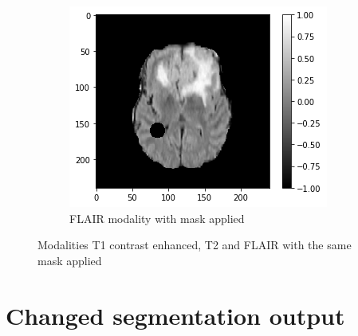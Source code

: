\begin{figure}[H]
    \begin{subfigure}[t]{.33\textwidth}
        \centering
        \includegraphics[width=\linewidth]{chapters/06_hdm/images_masked/masked_3.png}
        \caption{FLAIR modality with mask applied}
    \end{subfigure}
    \caption{Modalities T1 contrast enhanced, T2 and FLAIR with the same mask applied}
    \label{hdm_masks_2}
\end{figure}



\section{Changed segmentation output}

